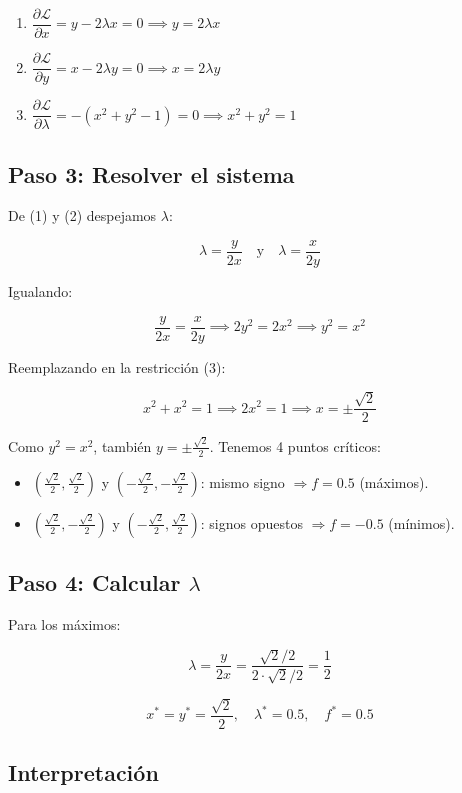 \documentclass[12pt]{article}
\begin{document}
\begin{enumerate}
    \item $\dfrac{\partial \mathcal{L}}{\partial x} = y - 2\lambda x = 0 \implies y = 2\lambda x$
    \item $\dfrac{\partial \mathcal{L}}{\partial y} = x - 2\lambda y = 0 \implies x = 2\lambda y$
    \item $\dfrac{\partial \mathcal{L}}{\partial \lambda} = -(x^2 + y^2 - 1) = 0 \implies x^2 + y^2 = 1$
\end{enumerate}

\subsection{Paso 3: Resolver el sistema}

De (1) y (2) despejamos $\lambda$:

\[
\lambda = \frac{y}{2x} \quad \text{y} \quad \lambda = \frac{x}{2y}
\]

Igualando:

\[
\frac{y}{2x} = \frac{x}{2y} \implies 2y^2 = 2x^2 \implies y^2 = x^2
\]

Reemplazando en la restricción (3):

\[
x^2 + x^2 = 1 \implies 2x^2 = 1 \implies x = \pm \frac{\sqrt{2}}{2}
\]

Como $y^2 = x^2$, también $y = \pm \frac{\sqrt{2}}{2}$. Tenemos 4 puntos críticos:

\begin{itemize}
    \item $(\frac{\sqrt{2}}{2}, \frac{\sqrt{2}}{2})$ y $(-\frac{\sqrt{2}}{2}, -\frac{\sqrt{2}}{2})$: mismo signo $\Rightarrow f = 0.5$ (máximos).
    \item $(\frac{\sqrt{2}}{2}, -\frac{\sqrt{2}}{2})$ y $(-\frac{\sqrt{2}}{2}, \frac{\sqrt{2}}{2})$: signos opuestos $\Rightarrow f = -0.5$ (mínimos).
\end{itemize}

\subsection{Paso 4: Calcular $\lambda$}

Para los máximos:

\[
\lambda = \frac{y}{2x} = \frac{\sqrt{2}/2}{2 \cdot \sqrt{2}/2} = \frac{1}{2}
\]

\[
\boxed{x^* = y^* = \frac{\sqrt{2}}{2}, \quad \lambda^* = 0.5, \quad f^* = 0.5}
\]

\subsection{Interpretación}
\end{document}
